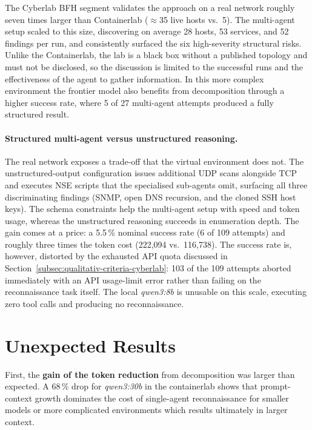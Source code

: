 The Cyberlab BFH segment validates the approach on a real network roughly seven
times larger than \gls{Containerlab} (\(\approx\)35 live hosts vs.\ 5).
The multi-agent setup scaled to this size, discovering on average 28 hosts,
53 services, and 52 findings per run, and consistently surfaced the six
high-severity structural risks.
Unlike the \gls{Containerlab}, the lab is a black box without a published topology and must
not be disclosed, so the discussion is limited to the successful runs and the effectiveness of the
agent to gather information.
In this more complex environment the frontier model also benefits from decomposition through a
higher success rate, where 5 of 27 multi-agent attempts produced a fully structured result.

\paragraph{Structured multi-agent versus unstructured reasoning.}

The real network exposes a trade-off that the virtual environment does not.
The unstructured-output configuration issues additional \gls{UDP} scans alongside \gls{TCP} and executes
\gls{NSE} scripts that the specialised sub-agents omit, surfacing all three discriminating
findings (\gls{SNMP}, open \gls{DNS} recursion, and the cloned \gls{SSH} host keys).
The schema constraints help the multi-agent setup with speed and token usage, whereas the unstructured reasoning succeeds in enumeration depth.
The gain comes at a price: a 5.5\,\% nominal success rate (6 of 109 attempts) and roughly three times the
token cost (222,094 vs.\ 116,738).
The success rate is, however, distorted by the exhausted \gls{API} quota discussed in
Section~\ref{subsec:qualitativ-criteria-cyberlab}: 103 of the 109 attempts aborted immediately
with an \gls{API} usage-limit error rather than failing on the reconnaissance task itself.
The local \textit{qwen3:8b} is unusable on this scale, executing zero tool calls and producing no reconnaissance.


\section{Unexpected Results}\label{sec:discussion-unexpected}

First, the \textbf{gain of the token reduction} from decomposition was larger
than expected.
A 68\,\% drop for \textit{qwen3:30b} in the containerlab shows that prompt-context growth
dominates the cost of single-agent reconnaissance for smaller models or
more complicated environments which results ultimately in larger context.


